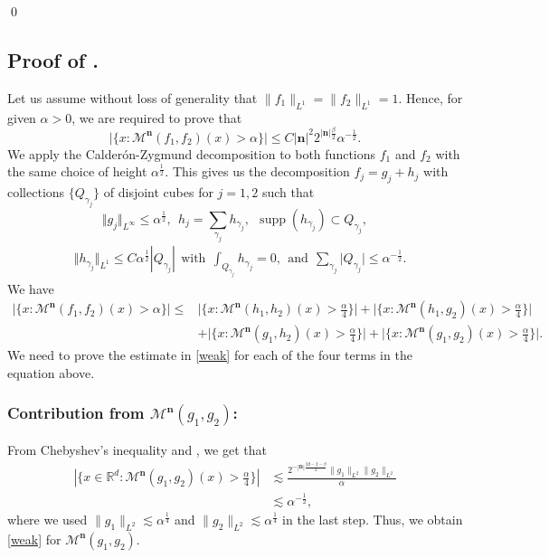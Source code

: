 \documentclass[a4paper,reqno]{amsart}
\numberwithin{equation}{section}
\newcommand{\supp}{\operatorname{supp}}
\begin{document}
	\qed
	
	\subsection{Proof of .}
	Let us assume without loss of generality that $\|f_1\|_{L^1}=\|f_2\|_{L^1}=1$. Hence, for given  $\alpha>0$, we are required to prove that 
	\begin{equation}\label{weak}
		\Big|\{x:\mathcal{M}^{\mathbf{n}}(f_1,f_2)(x)>\alpha\}\Big|\leq C|\mathbf{n}|^{2}2^{|\mathbf{n}|\frac{\beta}{2}}\alpha^{-\frac{1}{2}}.
	\end{equation}
	We apply the Calder\'{o}n-Zygmund decomposition to both functions $f_1$ and $f_2$ with the same choice of height $\alpha^{\frac{1}{2}}$. This gives us the decomposition $f_j=g_j+h_j$ with collections $\{Q_{\gamma_j}\}$ of disjoint cubes for $ j=1,2$ such that 
	\[\Vert g_j\Vert_{L^{\infty}}\leq \alpha^{\frac{1}{2}}, ~~h_j=\sum_{\gamma_j}h_{\gamma_j},~~\supp(h_{\gamma_j})\subset Q_{\gamma_j},\]
	\begin{align*}
		&\Vert h_{\gamma_j}\Vert_{L^{1}}\leq C\alpha^{\frac{1}{2}}|Q_{\gamma_j}| ~~ \text{with}~~ \int_{Q_{\gamma_j}}h_{\gamma_j}=0, ~~\text{and} ~~ \sum_{\gamma_j}\big|Q_{\gamma_j}\big|\leq \alpha^{-\frac{1}{2}}.
	\end{align*}
	We have
	\begin{align*}
		\Big|\{x:\mathcal{M}^{\mathbf{n}}(f_1,f_2)(x)>\alpha\}\Big|\leq&\Big|\{x:\mathcal{M}^{\mathbf{n}}(h_1,h_2)(x)>\frac{\alpha}{4}\}\Big|+\Big|\{x:\mathcal{M}^{\mathbf{n}}(h_1,g_2)(x)>\frac{\alpha}{4}\}\Big|\\
		&+\Big|\{x:\mathcal{M}^{\mathbf{n}}(g_1,h_2)(x)>\frac{\alpha}{4}\}\Big|+\Big|\{x:\mathcal{M}^{\mathbf{n}}(g_1,g_2)(x)>\frac{\alpha}{4}\}\Big|.
	\end{align*}
	We need to prove the estimate in \eqref{weak} for each of the four terms in the equation above.
	\subsubsection*{\bf Contribution from $\mathcal{M}^{\mathbf{n}}(g_1,g_2)$: }
	From Chebyshev's inequality and , we get that
	\begin{align*}
		|\{x\in \mathbb{R}^{d}:\mathcal{M}^{\mathbf{n}}(g_1,g_2)(x)>\frac{\alpha}{4}\}|&\lesssim \frac{2^{-|\mathbf{n}|\frac{2d-2-\beta}{2}}\|g_1\|_{L^2}\|g_2\|_{L^2}}{\alpha}\\
		&\lesssim \alpha^{-\frac{1}{2}},
	\end{align*}
	where we used $\|g_1\|_{L^2}\lesssim\alpha^{\frac{1}{4}}$ and $\|g_2\|_{L^2}\lesssim\alpha^{\frac{1}{4}}$ in the last step. Thus, we obtain \eqref{weak} for $\mathcal{M}^{\mathbf{n}}(g_1,g_2)$.
	
\end{document}
